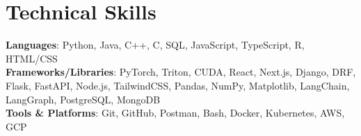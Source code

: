 \documentclass[letterpaper,11pt]{article}
\begin{document}
\section{Technical Skills}
 \begin{itemize}[leftmargin=0.15in, label={}]
    \small{\item{
     \textbf{Languages}{: Python, Java, C++, C, SQL, JavaScript, TypeScript, R, HTML/CSS} \\
     \textbf{Frameworks/Libraries}{: PyTorch, Triton, CUDA, React, Next.js, Django, DRF, Flask, FastAPI, Node.js, TailwindCSS, Pandas, NumPy, Matplotlib, LangChain, LangGraph, PostgreSQL, MongoDB} \\
     \textbf{Tools \& Platforms}{: Git, GitHub, Postman, Bash, Docker, Kubernetes, AWS, GCP} \\
    }}
 \end{itemize}
\end{document}
